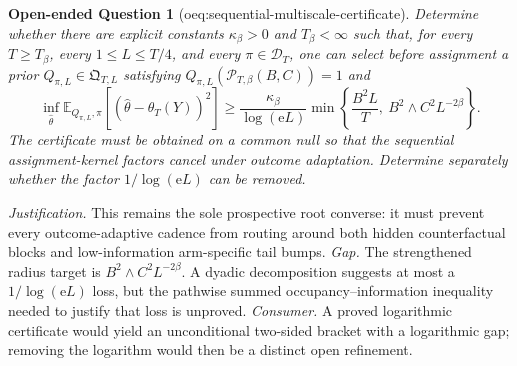 \documentclass{article}
\newtheorem{openendedquestion}{Open-ended Question}
\begin{document}
\begin{openendedquestion}[oeq:sequential-multiscale-certificate]\label{oeq:sequential-multiscale-certificate}
Determine whether there are explicit constants \(\kappa_\beta>0\) and \(T_\beta<\infty\) such that, for every \(T\ge T_\beta\), every \(1\le L\le T/4\), and every \(\pi\in\mathcal D_T\), one can select before assignment a prior \(Q_{\pi,L}\in\mathfrak Q_{T,L}\) satisfying \(Q_{\pi,L}(\mathcal P_{T,\beta}(B,C))=1\) and \[\inf_{\widehat\theta}\mathbb E_{Q_{\pi,L},\pi}[(\widehat\theta-\theta_T(Y))^2]\ge\frac{\kappa_\beta}{\log(\mathrm eL)}\min\left\{\frac{B^2L}{T},\ B^2\wedge C^2L^{-2\beta}\right\}.\] The certificate must be obtained on a common null so that the sequential assignment-kernel factors cancel under outcome adaptation. Determine separately whether the factor \(1/\log(\mathrm eL)\) can be removed.
\end{openendedquestion}
\par\smallskip\noindent \textit{Justification.} This remains the sole prospective root converse: it must prevent every outcome-adaptive cadence from routing around both hidden counterfactual blocks and low-information arm-specific tail bumps. \textit{Gap.} The strengthened radius target is \(B^2\wedge C^2L^{-2\beta}\).  A dyadic decomposition suggests at most a \(1/\log(\mathrm eL)\) loss, but the pathwise summed occupancy--information inequality needed to justify that loss is unproved. \textit{Consumer.} A proved logarithmic certificate would yield an unconditional two-sided bracket with a logarithmic gap; removing the logarithm would then be a distinct open refinement.
\end{document}
